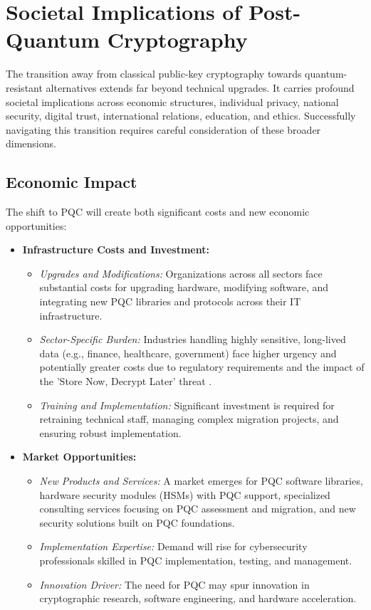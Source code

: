 \chapter{Societal Implications of Post-Quantum Cryptography}\label{chap:societal}

The transition away from classical public-key cryptography towards quantum-resistant alternatives extends far beyond technical upgrades. It carries profound societal implications across economic structures, individual privacy, national security, digital trust, international relations, education, and ethics. Successfully navigating this transition requires careful consideration of these broader dimensions.

\section{Economic Impact}\label{sec:economic_ch9}

The shift to PQC will create both significant costs and new economic opportunities:

\begin{itemize}
    \item \textbf{Infrastructure Costs and Investment:}
    \begin{itemize}
        \item \textit{Upgrades and Modifications:} Organizations across all sectors face substantial costs for upgrading hardware, modifying software, and integrating new PQC libraries and protocols across their IT infrastructure.
        \item \textit{Sector-Specific Burden:} Industries handling highly sensitive, long-lived data (e.g., finance, healthcare, government) face higher urgency and potentially greater costs due to regulatory requirements and the impact of the 'Store Now, Decrypt Later' threat \parencite{pqc_economic_impact_finance, pqc_economic_impact_healthcare}.
        \item \textit{Training and Implementation:} Significant investment is required for retraining technical staff, managing complex migration projects, and ensuring robust implementation.
    \end{itemize}
    \item \textbf{Market Opportunities:}
    \begin{itemize}
        \item \textit{New Products and Services:} A market emerges for PQC software libraries, hardware security modules (HSMs) with PQC support, specialized consulting services focusing on PQC assessment and migration, and new security solutions built on PQC foundations.
        \item \textit{Implementation Expertise:} Demand will rise for cybersecurity professionals skilled in PQC implementation, testing, and management.
        \item \textit{Innovation Driver:} The need for PQC may spur innovation in cryptographic research, software engineering, and hardware acceleration.
    \end{itemize}
\end{itemize}

